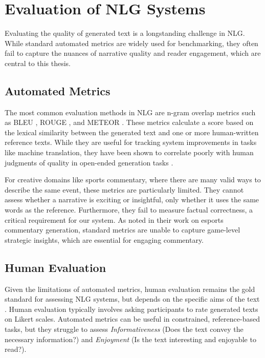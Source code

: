\section{Evaluation of NLG Systems}
Evaluating the quality of generated text is a longstanding challenge in NLG. While standard automated metrics are widely used for benchmarking, they often fail to capture the nuances of narrative quality and reader engagement, which are central to this thesis.

\subsection{Automated Metrics}
The most common evaluation methods in NLG are n-gram overlap metrics such as BLEU \cite{papineni2002}, ROUGE \cite{lin2004}, and METEOR \cite{banerjee2005}. These metrics calculate a score based on the lexical similarity between the generated text and one or more human-written reference texts. While they are useful for tracking system improvements in tasks like machine translation, they have been shown to correlate poorly with human judgments of quality in open-ended generation tasks \cite{reiter2018,vanderlee2019,vanderlee2021}.

For creative domains like sports commentary, where there are many valid ways to describe the same event, these metrics are particularly limited. They cannot assess whether a narrative is exciting or insightful, only whether it uses the same words as the reference. Furthermore, they fail to measure factual correctness, a critical requirement for our system. As \citet{wang2021} noted in their work on esports commentary generation, standard metrics are unable to capture game-level strategic insights, which are essential for engaging commentary.

\subsection{Human Evaluation}
Given the limitations of automated metrics, human evaluation remains the gold standard for assessing NLG systems, but depends on the specific aims of the text \cite{vanderlee2019}. Human evaluation typically involves asking participants to rate generated texts on Likert scales. Automated metrics can be useful in constrained, reference-based tasks, but they struggle to assess \textit{Informativeness} (Does the text convey the necessary information?) and \textit{Enjoyment} (Is the text interesting and enjoyable to read?).


